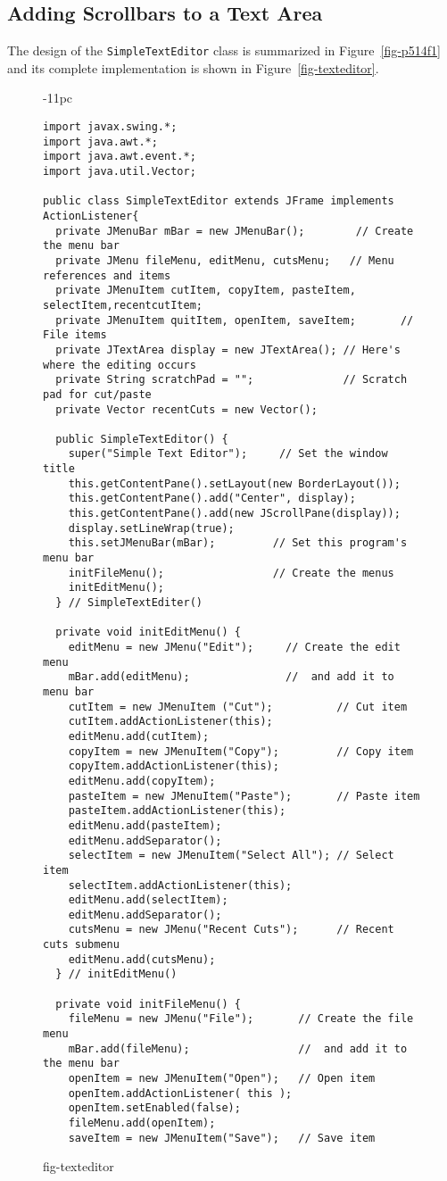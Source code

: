 \subsection{Adding Scrollbars to a Text Area}
\noindent The design of the {\tt SimpleTextEditor} class is summarized in
Figure~\ref{fig-p514f1} and its complete implementation is shown in
Figure~\ref{fig-texteditor}. 
\pagebreak
\begin{figure}[h!]
\jjjprogstart
\begin{jjjlistingleft}[37pc]{-11pc}
\begin{lstlisting}
import javax.swing.*;
import java.awt.*;
import java.awt.event.*;
import java.util.Vector;

public class SimpleTextEditor extends JFrame implements ActionListener{
  private JMenuBar mBar = new JMenuBar();        // Create the menu bar
  private JMenu fileMenu, editMenu, cutsMenu;   // Menu references and items
  private JMenuItem cutItem, copyItem, pasteItem, selectItem,recentcutItem; 
  private JMenuItem quitItem, openItem, saveItem;       // File items
  private JTextArea display = new JTextArea(); // Here's where the editing occurs
  private String scratchPad = "";              // Scratch pad for cut/paste
  private Vector recentCuts = new Vector();

  public SimpleTextEditor() {
    super("Simple Text Editor");     // Set the window title
    this.getContentPane().setLayout(new BorderLayout());
    this.getContentPane().add("Center", display);
    this.getContentPane().add(new JScrollPane(display));
    display.setLineWrap(true);
    this.setJMenuBar(mBar);         // Set this program's menu bar
    initFileMenu();                 // Create the menus
    initEditMenu();
  } // SimpleTextEditer()

  private void initEditMenu() {
    editMenu = new JMenu("Edit");     // Create the edit menu
    mBar.add(editMenu);               //  and add it to menu bar
    cutItem = new JMenuItem ("Cut");          // Cut item
    cutItem.addActionListener(this);
    editMenu.add(cutItem);
    copyItem = new JMenuItem("Copy");         // Copy item
    copyItem.addActionListener(this);
    editMenu.add(copyItem);
    pasteItem = new JMenuItem("Paste");       // Paste item
    pasteItem.addActionListener(this);
    editMenu.add(pasteItem);
    editMenu.addSeparator();
    selectItem = new JMenuItem("Select All"); // Select item
    selectItem.addActionListener(this);
    editMenu.add(selectItem);
    editMenu.addSeparator();
    cutsMenu = new JMenu("Recent Cuts");      // Recent cuts submenu
    editMenu.add(cutsMenu);
  } // initEditMenu()

  private void initFileMenu() {
    fileMenu = new JMenu("File");       // Create the file menu
    mBar.add(fileMenu);                 //  and add it to the menu bar
    openItem = new JMenuItem("Open");   // Open item
    openItem.addActionListener( this );
    openItem.setEnabled(false);
    fileMenu.add(openItem);
    saveItem = new JMenuItem("Save");   // Save item
\end{lstlisting}
\end{jjjlistingleft}
{fig-texteditor}
\end{figure}

